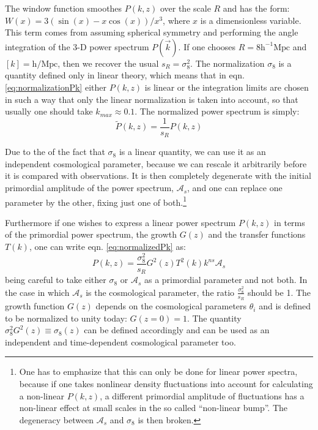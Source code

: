 The window function smoothes $P(k,z)$ over the scale $R$ and has
the form: $W(x)=3(\sin(x)-x\cos(x))/x^{3}$, where $x$ is a dimensionless
variable. This term comes from assuming spherical symmetry and performing
the angle integration of the 3-D power spectrum $P(\vec{k})$. If
one chooses $R=8\mbox{h}^{-1}\mbox{Mpc}$ and $[k]=\mbox{h}/\mbox{Mpc}$,
then we recover the usual $s_{R}=\sigma_{8}^{2}$. The normalization
$\sigma_{8}$ is a quantity defined only in linear theory, which means
that in eqn. \ref{eq:normalizationPk} either $P(k,z)$ is linear
or the integration limits are chosen in such a way that only the linear
normalization is taken into account, so that usually one should take
$k_{max}\approx0.1$. The normalized power spectrum is simply: 
\begin{equation}
\tilde{P}(k,z)=\frac{1}{s_{R}}P(k,z)
\end{equation}


Due to the of the fact that $\sigma_{8}$ is a linear quantity, we
can use it as an independent cosmological parameter, because we can
rescale it arbitrarily before it is compared with observations. It
is then completely degenerate with the initial primordial amplitude
of the power spectrum, $\mathcal{A}_{s}$, and one can replace one
parameter by the other, fixing just one of both.\footnote{One has to emphasize that this can only be done for linear power spectra,
because if one takes nonlinear density fluctuations into account for
calculating a non-linear $P(k,z)$, a different primordial amplitude
of fluctuations has a non-linear effect at small scales in the so
called ``non-linear bump''. The degeneracy between $\mathcal{A}_{s}$
and $\sigma_{8}$ is then broken.}

Furthermore if one wishes to express a linear power spectrum $P(k,z)$
in terms of the primordial power spectrum, the growth $G(z)$ and
the transfer functions $T(k)$, one can write eqn. \ref{eq:normalizedPk}
as: 
\begin{equation}
P(k,z)=\frac{\sigma_{8}^{2}}{s_{R}}G^{2}(z)T^{2}(k)k^{ns}\mathcal{A}_{s}
\end{equation}
being careful to take either $\sigma_{8}$ or $\mathcal{A}_{s}$ as
a primordial parameter and not both. In the case in which $\mathcal{A}_{s}$
is the cosmological parameter, the ratio $\frac{\sigma_{8}^{2}}{s_{R}}$
should be 1. The growth function $G(z)$ depends on the cosmological
parameters $\theta_{i}$ and is defined to be normalized to unity
today: $G(z=0)=1$. The quantity $\sigma_{8}^{2}G^{2}(z)\equiv\sigma_{8}(z)$
can be defined accordingly and can be used as an independent and time-dependent
cosmological parameter too. 


